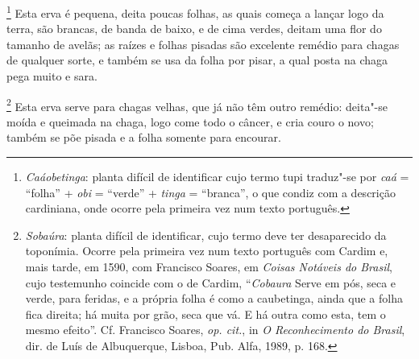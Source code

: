 \begin{linenumbers}
\footnote{ \textit{Caáobetinga}: planta difícil
de identificar cujo termo tupi traduz"-se por \textit{caá} = ``folha'' +
\textit{obi} = ``verde'' + \textit{tinga} = ``branca'', o que condiz com a
descrição cardiniana, onde ocorre pela primeira vez num texto
português.} Esta erva é pequena, deita poucas folhas, as
quais começa a lançar logo da terra, são brancas, de banda de baixo, e
de cima verdes, deitam uma flor do tamanho de avelãs; as raízes e
folhas pisadas são excelente remédio para chagas de qualquer sorte, e
também se usa da folha por pisar, a qual posta na chaga pega muito e sara.

\footnote{ \textit{Sobaúra}: planta difícil de
identificar, cujo termo deve ter desaparecido da toponímia. Ocorre pela
primeira vez num texto português com Cardim e, mais tarde, em 1590, com
Francisco Soares, em \textit{Coisas Notáveis do Brasil}, cujo
testemunho coincide com o de Cardim, ``\textit{Cobaura} Serve em pós,
seca e verde, para feridas, e a própria folha é como a caubetinga,
ainda que a folha fica direita; há muita por grão, seca que vá. E há
outra como esta, tem o mesmo efeito''. Cf. Francisco Soares,
\textit{op. cit.}, in \textit{O Reconhecimento do Brasil}, dir. de Luís
de Albuquerque, Lisboa, Pub. Alfa, 1989, p. 168.} Esta erva
serve para chagas velhas, que já não têm outro remédio: deita"-se moída
e queimada na chaga, logo come todo o câncer, e cria couro o novo;
também se põe pisada e a folha somente para encourar.


\end{linenumbers}
